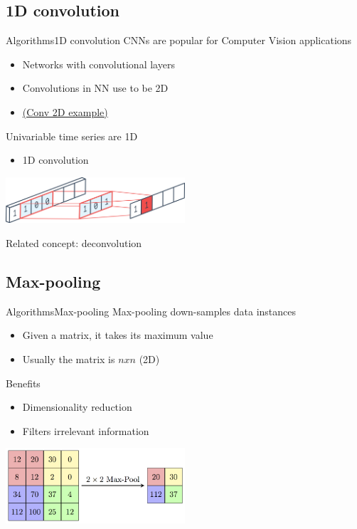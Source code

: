\documentclass[10pt,compress]{beamer} %
\begin{document}
\subsection{1D convolution}

\begin{frame}{Algorithms}{1D convolution}
        CNNs are popular for Computer Vision applications
	\begin{itemize}
		\item Networks with convolutional layers
		\item Convolutions in NN use to be 2D
		\item \href{https://miro.medium.com/max/500/1*GcI7G-JLAQiEoCON7xFbhg.gif}{(Conv 2D example)}
	\end{itemize}

	Univariable time series are 1D
	\begin{itemize}
		\item \alert{1D convolution}
	\end{itemize}

	\centering
	\includegraphics[width=0.5\textwidth]{figs/1dconv.png}

    	\flushleft Related concept: \alert{deconvolution} \\
\end{frame}

\subsection{Max-pooling}

\begin{frame}{Algorithms}{Max-pooling}
     	Max-pooling down-samples data instances
	\begin{itemize}
		\item Given a matrix, it takes its maximum value
		\item Usually the matrix is $n x n$ (2D)
	\end{itemize}
	Benefits
	\begin{itemize}
		\item Dimensionality reduction
		\item Filters irrelevant information
	\end{itemize}
	\bigskip
	\centering 
	\includegraphics[width=0.5\textwidth]{figs/maxpool.png}
\end{frame}
\end{document}
